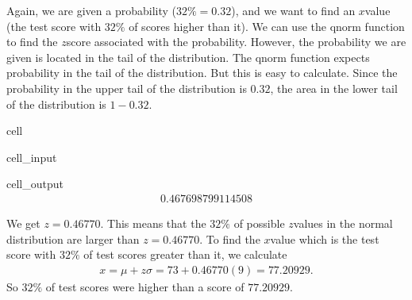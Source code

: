 \documentclass[letterpaper,10pt,english]{jupyterBook}
\begin{document}
\sphinxAtStartPar
Again, we are given a probability (\(32\% = 0.32\)), and we want to find an \(x\)\sphinxhyphen{}value (the test score with \(32\%\) of scores higher than it). We can use the qnorm function to find the \(z\)\sphinxhyphen{}score associated with the probability. However, the probability we are given is located in the  tail of the distribution. The qnorm function expects probability in the  tail of the distribution. But this is easy to calculate. Since the probability in the upper tail of the distribution is \(0.32\), the area in the lower tail of the distribution is \(1 - 0.32\).

\begin{sphinxuseclass}{cell}\begin{sphinxVerbatimInput}

\begin{sphinxuseclass}{cell_input}
\begin{sphinxVerbatim}[commandchars=\\\{\}]
\end{sphinxVerbatim}

\end{sphinxuseclass}\end{sphinxVerbatimInput}
\begin{sphinxVerbatimOutput}

\begin{sphinxuseclass}{cell_output}\begin{equation*}
\begin{split}0.467698799114508\end{split}
\end{equation*}
\end{sphinxuseclass}\end{sphinxVerbatimOutput}

\end{sphinxuseclass}
\sphinxAtStartPar
We get \(z = 0.46770\). This means that the \(32\%\) of possible \(z\)\sphinxhyphen{}values in the  normal distribution are larger than \(z = 0.46770\). To find the \(x\)\sphinxhyphen{}value which is the test score with \(32\%\) of test scores greater than it, we calculate
\begin{equation*}
\begin{split} x = \mu + z\sigma = 73 + 0.46770(9) = 77.20929. \end{split}
\end{equation*}
\sphinxAtStartPar
So \(32\%\) of test scores were higher than a score of \(77.20929\).
\end{document}
